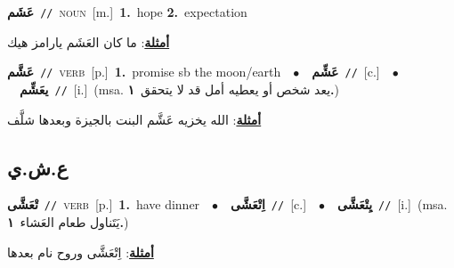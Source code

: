 \documentclass[10pt,a4paper,twoside]{article} %
\begin{document}
\begin{multicols}{2}
{\setlength\topsep{0pt}\textbf{\foreignlanguage{arabic}{عَشَم}}\ {\color{gray}\texttt{//}\color{black}}\ \textsc{noun}\ [m.]\ \textbf{1.}~hope  \textbf{2.}~expectation\  \begin{flushright}\color{gray}\foreignlanguage{arabic}{\textbf{\underline{\foreignlanguage{arabic}{أمثلة}}}: ما كان العَشَم يارامز هيك}\end{flushright}\color{black}} \vspace{2mm}

{\setlength\topsep{0pt}\textbf{\foreignlanguage{arabic}{عَشَّم}}\ {\color{gray}\texttt{//}\color{black}}\ \textsc{verb}\ [p.]\ \textbf{1.}~promise sb the moon/earth\ \ $\bullet$\ \ \setlength\topsep{0pt}\textbf{\foreignlanguage{arabic}{عَشِّم}}\ {\color{gray}\texttt{//}\color{black}}\ [c.]\ \ $\bullet$\ \ \setlength\topsep{0pt}\textbf{\foreignlanguage{arabic}{يعَشِّم}}\ {\color{gray}\texttt{//}\color{black}}\ [i.]\ \color{gray}(msa. \foreignlanguage{arabic}{يعد شخص أو يعطيه أمل قد لا يتحقق}~\foreignlanguage{arabic}{\textbf{١.}})\color{black}\  \begin{flushright}\color{gray}\foreignlanguage{arabic}{\textbf{\underline{\foreignlanguage{arabic}{أمثلة}}}: الله يخزيه عَشَّم البنت بالجيزة وبعدها شلَّف}\end{flushright}\color{black}} \vspace{2mm}

\vspace{-3mm}
\subsection*{\color{blue}\foreignlanguage{arabic}{ع.ش.ي}\color{blue}{}} 

{\setlength\topsep{0pt}\textbf{\foreignlanguage{arabic}{تْعَشَّى}}\ {\color{gray}\texttt{//}\color{black}}\ \textsc{verb}\ [p.]\ \textbf{1.}~have dinner\ \ $\bullet$\ \ \setlength\topsep{0pt}\textbf{\foreignlanguage{arabic}{اِتْعَشَّى}}\ {\color{gray}\texttt{//}\color{black}}\ [c.]\ \ $\bullet$\ \ \setlength\topsep{0pt}\textbf{\foreignlanguage{arabic}{يِتْعَشَّى}}\ {\color{gray}\texttt{//}\color{black}}\ [i.]\ \color{gray}(msa. \foreignlanguage{arabic}{يَتَناول طعام العَشاء}~\foreignlanguage{arabic}{\textbf{١.}})\color{black}\  \begin{flushright}\color{gray}\foreignlanguage{arabic}{\textbf{\underline{\foreignlanguage{arabic}{أمثلة}}}: اِتْعَشَّى وروح نام بعدها}\end{flushright}\color{black}} \vspace{2mm}


\end{multicols}
\end{document}
